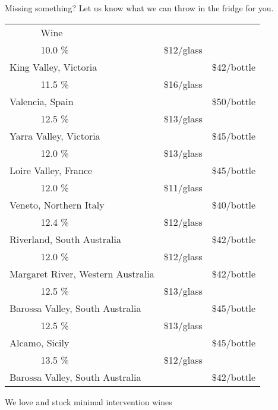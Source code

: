 \documentclass[12pt]{article}
\makeatletter
\newcommand*\ColText[1]{\textcolor{SpringGreen4}{#1}}
\newcommand*\GroupGlassTitle[2]{%
  \noalign{\vspace{2em}}
  \fontfamily{qzc}\selectfont #2 & \vspace{1em}\fontsize{20}{29}\selectfont\ColText{#1}}
\newenvironment{Group}
  {\vspace{2em}\noindent\begin{tabular*}{\textwidth}{@{} p{10mm} l@{\extracolsep{\fill}} r@{\hspace{1em}} r@{}}} %
  {\end{tabular*}}
\newcommand*\Booze[3]{%
  \noalign{\vspace{1em}}
  \multicolumn{2}{l}{ #1 \tiny\dotfill } & \scriptsize #2 \% \tiny\dotfill & \normalsize \$#3}
\newcommand*\Wine[5]{%
  \noalign{\vspace{0.5em}}
  \Booze{#1}{#3}{#4\tiny/glass} \\
  \multicolumn{2}{l}{ \hspace*{0.1em} \scriptsize #2 } & {} & \normalsize \$#5\tiny/bottle}
\newcommand*\Glass[2]{%
    \begin{tikzpicture}[remember picture,overlay]
        \node[xshift=5mm,yshift=0mm]{%
            \texttt{[image: Glasses/\#1.png]}
        };
    \end{tikzpicture}%
}
\newcommand*\GlassWine{%
    \Glass{wine}{4.5mm}}
\makeatother
\begin{document}
\vfill
\begin{center}
	Missing something? Let us know what we can throw in the fridge for you.
\end{center}
\pagebreak
\begin{Group}
    \GroupGlassTitle{Wine}{\GlassWine} \\
    \Wine{Puncheon Darts \textbf{Prosecco}}{King Valley, Victoria}{10.0}{12}{42} \\
    \Wine{Tharsys Cava Brut Nature}{Valencia, Spain}{11.5}{16}{50} \\
    \Wine{Lighthand \textbf{Chardonnay}}{Yarra Valley, Victoria}{12.5}{13}{45} \\
    \Wine{Guy Allion \textbf{Sauvignon Blanc}}{Loire Valley, France}{12.0}{13}{45} \\
    \Wine{Paladino \textbf{Pinot Grigio}}{Veneto, Northern Italy}{12.0}{11}{40} \\
    \Wine{Continental Platter Delirium \textbf{Orange}}{Riverland, South Australia}{12.4}{12}{42} \\
    \Wine{Continental Platter \textbf{Rosé}}{Margaret River, Western Australia}{12.0}{12}{42} \\
    \Wine{Quin Everyday Explorer Mataro \textbf{Rosé}}{Barossa Valley, South Australia}{12.5}{13}{45} \\
    \Wine{Ciello Rossa \textbf{Nero d'Avalo}}{Alcamo, Sicily}{12.5}{13}{45} \\
    \Wine{Continental Platter \textbf{Shiraz}}{Barossa Valley, South Australia}{13.5}{12}{42} \\
\end{Group}
\vfill
\begin{center}
	We love and stock minimal intervention wines
\end{center}
\pagebreak
\end{document}
